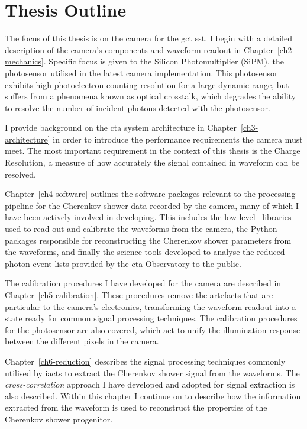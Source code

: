 \section{Thesis Outline}

The focus of this thesis is on the camera for the \gls{gct} \gls{sst}. I begin with a detailed description of the camera's components and waveform readout in Chapter~\ref{ch2-mechanics}. Specific focus is given to the Silicon Photomultiplier (SiPM), the photosensor utilised in the latest camera implementation. This photosensor exhibits high photoelectron counting resolution for a large dynamic range, but suffers from a phenomena known as optical crosstalk, which degrades the ability to resolve the number of incident photons detected with the photosensor.

I provide background on the \gls{cta} system architecture in Chapter~\ref{ch3-architecture} in order to introduce the performance requirements the camera must meet. The most important requirement in the context of this thesis is the Charge Resolution, a measure of how accurately the signal contained in waveform can be resolved.

Chapter~\ref{ch4-software} outlines the software packages relevant to the processing pipeline for the Cherenkov shower data recorded by the camera, many of which I have been actively involved in developing. This includes the low-level \cpp~libraries used to read out and calibrate the waveforms from the camera, the Python packages responsible for reconstructing the Cherenkov shower parameters from the waveforms, and finally the science tools developed to analyse the reduced photon event lists provided by the \gls{cta} Observatory to the public.

The calibration procedures I have developed for the camera are described in Chapter~\ref{ch5-calibration}. These procedures remove the artefacts that are particular to the camera's electronics, transforming the waveform readout into a state ready for common signal processing techniques. The calibration procedures for the photosensor are also covered, which act to unify the illumination response between the different pixels in the camera.

Chapter~\ref{ch6-reduction} describes the signal processing techniques commonly utilised by \glspl{iact} to extract the Cherenkov shower signal from the waveforms. The \textit{cross-correlation} approach I have developed and adopted for signal extraction is also described. Within this chapter I continue on to describe how the information extracted from the waveform is used to reconstruct the properties of the Cherenkov shower progenitor. 

